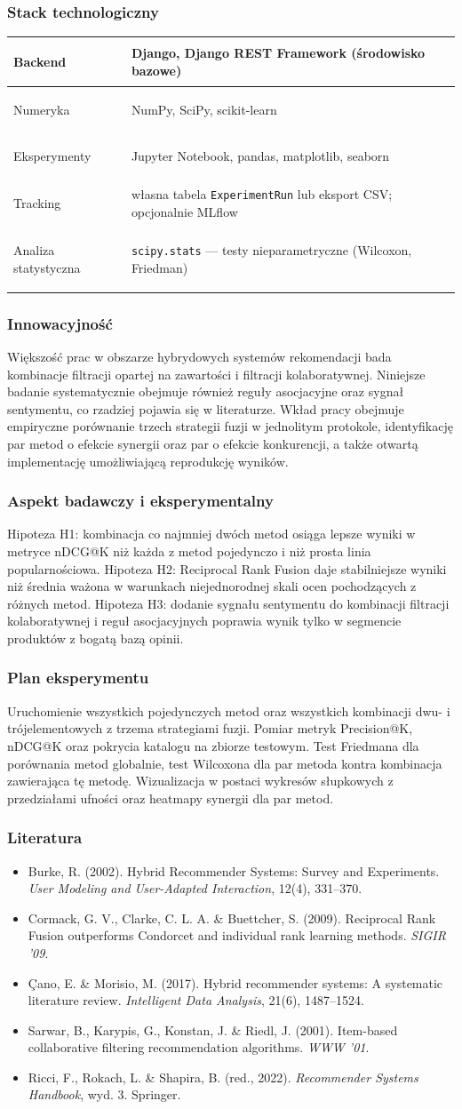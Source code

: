 \documentclass[12pt,a4paper]{article}
\newenvironment{stacktab}{%
    \arrayrulecolor{border}%
    \begin{tabular}{|>{\columncolor{lightbg}\bfseries\color{primary}\raggedright\arraybackslash}p{4.2cm}|>{\raggedright\arraybackslash}p{12cm}|}
    \hline
}{%
    \end{tabular}%
    \arrayrulecolor{black}%
}
\newcommand{\stackrow}[2]{#1 & #2 \\ \hline}
\newcommand{\topicsection}[1]{\subsubsection*{#1}}
\newenvironment{literatura}{%
    \topicsection{Literatura}
    \begin{itemize}[leftmargin=1.6em,labelsep=0.5em]
}{%
    \end{itemize}
}
\begin{document}
\topicsection{Stack technologiczny}
\begin{stacktab}
\stackrow{Backend}{Django, Django REST Framework (środowisko bazowe)}
\stackrow{Numeryka}{NumPy, SciPy, scikit-learn}
\stackrow{Eksperymenty}{Jupyter Notebook, pandas, matplotlib, seaborn}
\stackrow{Tracking}{własna tabela \texttt{ExperimentRun} lub eksport CSV; opcjonalnie MLflow}
\stackrow{Analiza statystyczna}{\texttt{scipy.stats} --- testy nieparametryczne (Wilcoxon, Friedman)}
\end{stacktab}

\topicsection{Innowacyjność}
Większość prac w obszarze hybrydowych systemów rekomendacji bada kombinacje filtracji opartej na zawartości i filtracji kolaboratywnej. Niniejsze badanie systematycznie obejmuje również reguły asocjacyjne oraz sygnał sentymentu, co rzadziej pojawia się w literaturze. Wkład pracy obejmuje empiryczne porównanie trzech strategii fuzji w jednolitym protokole, identyfikację par metod o efekcie synergii oraz par o efekcie konkurencji, a także otwartą implementację umożliwiającą reprodukcję wyników.

\topicsection{Aspekt badawczy i eksperymentalny}
Hipoteza H1: kombinacja co najmniej dwóch metod osiąga lepsze wyniki w metryce nDCG@K niż każda z metod pojedynczo i niż prosta linia popularnościowa. Hipoteza H2: Reciprocal Rank Fusion daje stabilniejsze wyniki niż średnia ważona w warunkach niejednorodnej skali ocen pochodzących z różnych metod. Hipoteza H3: dodanie sygnału sentymentu do kombinacji filtracji kolaboratywnej i reguł asocjacyjnych poprawia wynik tylko w segmencie produktów z bogatą bazą opinii.

\topicsection{Plan eksperymentu}
Uruchomienie wszystkich pojedynczych metod oraz wszystkich kombinacji dwu- i trójelementowych z trzema strategiami fuzji. Pomiar metryk Precision@K, nDCG@K oraz pokrycia katalogu na zbiorze testowym. Test Friedmana dla porównania metod globalnie, test Wilcoxona dla par metoda kontra kombinacja zawierająca tę metodę. Wizualizacja w postaci wykresów słupkowych z przedziałami ufności oraz heatmapy synergii dla par metod.

\begin{literatura}
\item Burke, R. (2002). Hybrid Recommender Systems: Survey and Experiments. \textit{User Modeling and User-Adapted Interaction}, 12(4), 331--370.
\item Cormack, G. V., Clarke, C. L. A. \& Buettcher, S. (2009). Reciprocal Rank Fusion outperforms Condorcet and individual rank learning methods. \textit{SIGIR '09}.
\item Çano, E. \& Morisio, M. (2017). Hybrid recommender systems: A systematic literature review. \textit{Intelligent Data Analysis}, 21(6), 1487--1524.
\item Sarwar, B., Karypis, G., Konstan, J. \& Riedl, J. (2001). Item-based collaborative filtering recommendation algorithms. \textit{WWW '01}.
\item Ricci, F., Rokach, L. \& Shapira, B. (red., 2022). \textit{Recommender Systems Handbook}, wyd. 3. Springer.
\end{literatura}
\end{document}
